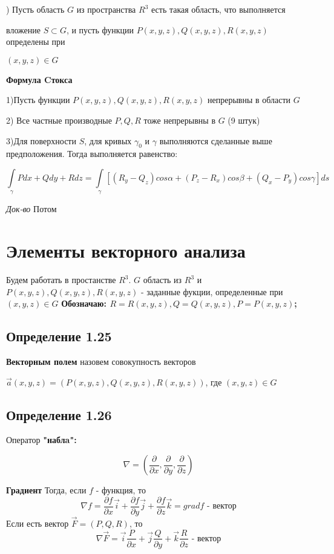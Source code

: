 \documentclass[12pt, english]{article}
\begin{document}
) Пусть область $G$ из пространства $R^3$ есть такая область, что
выполняется\par  вложение $S \subset G$, и пусть функции $P(x, y, z), Q(x, y, z),
R(x, y, z)$ определены при \par $(x, y, z) \in G$

\textbf{Формула Cтокса}

1)Пусть функции $P(x, y, z), Q(x, y, z), R(x, y, z)$ непрерывны в области $G$ 

2) Все частные производные $P , Q , R$ тоже непрерывны в $G$ (9 штук)

3)Для поверхности $S$, для кривых $\gamma_0$ и $\gamma$ выполняются сделанные выше
предположения. Тогда выполняется равенство: 

\begin{equation}\label{eq11}
\int\limits_{\gamma} Pdx + Qdy + Rdz
=
\int\limits_{\gamma} [(R_y - Q_z)cos\alpha + (P_z - R_x)cos\beta	+ (Q_x - P_y)cos\gamma]ds
\end{equation}

\textit{Док-во}
Потом



\newpage
\section{Элементы векторного анализа}
	Будем работать в простанстве $R^3$. $G$ область из $R^3$ и $P(x,y,z), Q(x,y,z), R(x,y,z)$ - заданные фукции, определенные при 
	$(x,y,z) \in G$
	\textbf{Обозначаю: $R = R(x, y ,z) , Q = Q(x,y,z) , P = P(x,y,z)$;}
	
\subsection*{Определение 1.25}
	\textbf{Векторным полем} назовем совокупность векторов 
	
	$\vec{a}(x,y,z) = (P(x,y,z) , Q(x,y,z), R(x,y,z))$, где $(x,y,z) \in G$
	
\subsection*{Определение 1.26}
Оператор \textbf{"наблa":}
	
	

	$$\nabla = ( \frac{\partial}{\partial x} ,  \frac{\partial}{\partial y} , \frac{\partial}{\partial z})$$
	
\textbf{Градиент}
	Тогда, если $f$ - функция, то  
	$$\nabla f =   \frac{\partial f}{\partial x} \vec{i} +  \frac{\partial f}{\partial y}\vec{j} + \frac{\partial f}{\partial z} \vec{k}= grad f \text{ - вектор}$$ 
 	Если есть вектор $\vec{F} = (P, Q, R)$, то
 		$$\nabla \vec{F} = \vec{i}  \frac{P}{\partial x} + \vec{j} \frac{Q}{\partial y} + \vec{k}\frac{R}{\partial z} \text{ - вектор}$$ 
	
\end{document}
